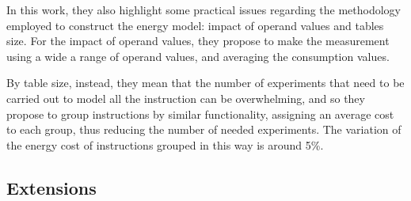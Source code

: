 In this work, they also highlight some practical issues regarding the methodology employed to construct the energy model: impact of operand values and tables size. For the impact of operand values, they propose to make the measurement using a wide a range of operand values, and averaging the consumption values. \par 
By table size, instead, they mean that the number of experiments that need to be carried out to model all the instruction can be overwhelming, and so they propose to group instructions by similar functionality, assigning an average cost to each group, thus reducing the number of needed experiments. The variation of the energy cost of instructions grouped in this way is around 5\%. 

\subsection{Extensions}
